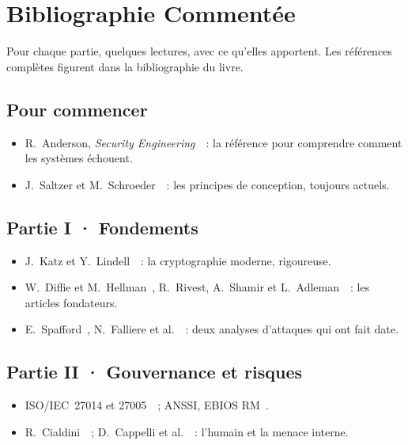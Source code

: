 
\chapter{Bibliographie Commentée}
\label{ann:bibliographie}

Pour chaque partie, quelques lectures, avec ce qu'elles apportent. Les références
complètes figurent dans la bibliographie du livre.

\section*{Pour commencer}
\begin{itemize}
    \item R.~Anderson, \emph{Security Engineering}~\cite{anderson2020}~: la référence pour comprendre comment les systèmes échouent.
    \item J.~Saltzer et M.~Schroeder~\cite{saltzer1975}~: les principes de conception, toujours actuels.
\end{itemize}

\section*{Partie I · Fondements}
\begin{itemize}
    \item J.~Katz et Y.~Lindell~\cite{katz2020}~: la cryptographie moderne, rigoureuse.
    \item W.~Diffie et M.~Hellman~\cite{diffie1976}, R.~Rivest, A.~Shamir et L.~Adleman~\cite{rivest1978}~: les articles fondateurs.
    \item E.~Spafford~\cite{spafford1989}, N.~Falliere et al.~\cite{falliere2011}~: deux analyses d'attaques qui ont fait date.
\end{itemize}

\section*{Partie II · Gouvernance et risques}
\begin{itemize}
    \item ISO/IEC~27014 et 27005~\cite{iso27014_2020,iso27005_2022}~; ANSSI, EBIOS RM~\cite{anssi2018ebios}.
    \item R.~Cialdini~\cite{cialdini1984}~; D.~Cappelli et al.~\cite{cappelli2012}~: l'humain et la menace interne.
\end{itemize}

